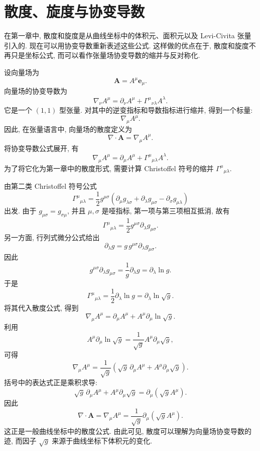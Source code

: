 \section{散度、旋度与协变导数}

在第一章中, 散度和旋度是从曲线坐标中的体积元、面积元以及 Levi-Civita 张量引入的. 现在可以用协变导数重新表述这些公式. 这样做的优点在于, 散度和旋度不再只是坐标公式, 而可以看作张量场协变导数的缩并与反对称化. 

设向量场为
\[
\bm{A}=A^{\mu}\bm{e}_{\mu}.
\]
向量场的协变导数为
\[
\nabla_{\nu}A^{\mu}
=
\partial_{\nu}A^{\mu}
+
\Gamma^{\mu}{}_{\nu\lambda}A^{\lambda}.
\]
它是一个 $(1,1)$ 型张量. 对其中的逆变指标和导数指标进行缩并, 得到一个标量: 
\[
\nabla_{\mu}A^{\mu}.
\]
因此, 在张量语言中, 向量场的散度定义为
\[
\nabla\cdot\bm{A}
=
\nabla_{\mu}A^{\mu}.
\]
将协变导数公式展开, 有
\[
\nabla_{\mu}A^{\mu}
=
\partial_{\mu}A^{\mu}
+
\Gamma^{\mu}{}_{\mu\lambda}A^{\lambda}.
\]
为了将它化为第一章中的散度形式, 需要计算 Christoffel 符号的缩并 $\Gamma^{\mu}{}_{\mu\lambda}$. 

由第二类 Christoffel 符号公式
\[
\Gamma^{\mu}{}_{\mu\lambda}
=
\frac{1}{2}g^{\mu\sigma}
\left(
\partial_{\mu}g_{\lambda\sigma}
+
\partial_{\lambda}g_{\mu\sigma}
-
\partial_{\sigma}g_{\mu\lambda}
\right)
\]
出发. 由于 $g_{\mu\sigma}=g_{\sigma\mu}$, 并且 $\mu,\sigma$ 是哑指标, 第一项与第三项相互抵消, 故有
\[
\Gamma^{\mu}{}_{\mu\lambda}
=
\frac{1}{2}g^{\mu\sigma}\partial_{\lambda}g_{\mu\sigma}.
\]
另一方面, 行列式微分公式给出
\[
\partial_{\lambda}g
=
g\,g^{\mu\sigma}\partial_{\lambda}g_{\mu\sigma}.
\]
因此
\[
g^{\mu\sigma}\partial_{\lambda}g_{\mu\sigma}
=
\frac{1}{g}\partial_{\lambda}g
=
\partial_{\lambda}\ln g.
\]
于是
\[
\Gamma^{\mu}{}_{\mu\lambda}
=
\frac{1}{2}\partial_{\lambda}\ln g
=
\partial_{\lambda}\ln\sqrt{g}.
\]
将其代入散度公式, 得到
\[
\nabla_{\mu}A^{\mu}
=
\partial_{\mu}A^{\mu}
+
A^{\mu}\partial_{\mu}\ln\sqrt{g}.
\]
利用
\[
A^{\mu}\partial_{\mu}\ln\sqrt{g}
=
\frac{1}{\sqrt{g}}A^{\mu}\partial_{\mu}\sqrt{g},
\]
可得
\[
\nabla_{\mu}A^{\mu}
=
\frac{1}{\sqrt{g}}
\left(
\sqrt{g}\,\partial_{\mu}A^{\mu}
+
A^{\mu}\partial_{\mu}\sqrt{g}
\right).
\]
括号中的表达式正是乘积求导: 
\[
\sqrt{g}\,\partial_{\mu}A^{\mu}
+
A^{\mu}\partial_{\mu}\sqrt{g}
=
\partial_{\mu}(\sqrt{g}A^{\mu}).
\]
因此
\begin{equation}
	\nabla\cdot\bm{A}
	=
	\nabla_{\mu}A^{\mu}
	=
	\frac{1}{\sqrt{g}}\partial_{\mu}(\sqrt{g}A^{\mu}).
	\label{eq:2.16}
\end{equation}
这正是一般曲线坐标中的散度公式. 由此可见, 散度可以理解为向量场协变导数的迹, 而因子 $\sqrt{g}$ 来源于曲线坐标下体积元的变化. 

